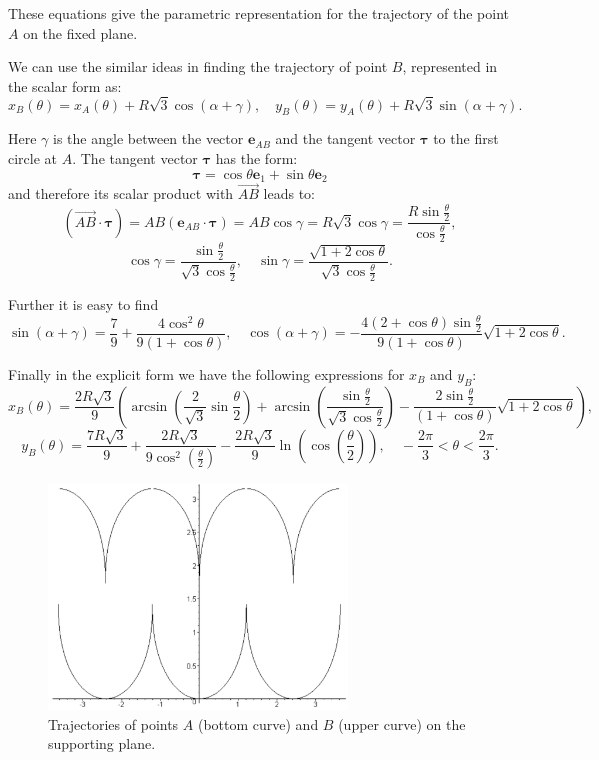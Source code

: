 \documentclass[10pt]{enoc2011}
\renewcommand{\vec}[1]{\boldsymbol{#1}}
\begin{document}
These equations give the parametric representation for the trajectory of the point $A$ on the fixed plane.

We can use the similar ideas in finding  the trajectory of point $B$, 
represented in the scalar form as:
$$
x_B\left(\theta\right)=x_A\left(\theta\right)+R\sqrt{3}\cos\left(\alpha+\gamma\right),\quad
y_B\left(\theta\right)=y_A\left(\theta\right)+R\sqrt{3}\sin\left(\alpha+\gamma\right).
$$

Here $\gamma$ is the angle between the vector $\vec e_{AB}$ and the tangent vector $\vec\tau$ to the first circle at $A$. The tangent vector $\vec\tau$ has the form:
$$
\vec\tau=\cos\theta\vec e_1+\sin\theta\vec e_2
$$
and therefore its scalar product with $\overrightarrow{AB}$ leads to:
$$
\left(\overrightarrow{AB}\cdot\vec\tau\right)=AB\left(\vec e_{AB}\cdot\vec\tau\right)=AB\cos\gamma=
R\sqrt{3}\cos\gamma=\frac{R\sin\frac{\theta}{2}}{\cos\frac{\theta}{2}},
$$
$$
\cos\gamma=\frac{\sin\frac{\theta}{2}}{\sqrt{3}\cos\frac{\theta}{2}},\quad
\sin\gamma=\frac{\sqrt{1+2\cos\theta}}{\sqrt{3}\cos\frac{\theta}{2}}.
$$

Further it is easy to find
$$
\sin\left(\alpha+\gamma\right)=\frac{7}{9}+\frac{4\cos^2\theta}{9\left(1+\cos\theta\right)},\quad
\cos\left(\alpha+\gamma\right)=-\frac{4\left(2+\cos\theta\right)\sin\frac{\theta}{2}}{9\left(1+\cos\theta\right)}
\sqrt{1+2\cos\theta}.
$$

Finally in the explicit form we have the following expressions for $x_B$ and $y_B$:
$$
x_B\left(\theta\right)\!=\!\frac{2R\sqrt{3}}{9}\left(\arcsin\left(\frac{2}{\sqrt{3}}\sin\frac{\theta}{2}\right)\!+\!
\arcsin\left(\frac{\sin\frac{\theta}{2}}{\sqrt{3}\cos\frac{\theta}{2}}\right)\!-\!
\frac{2\sin\frac{\theta}{2}}{\left(1\!+\!\cos\theta\right)}\sqrt{1\!+\!2\cos\theta}\right),
$$
$$
y_B\left(\theta\right)=\frac{7R\sqrt{3}}{9}+\frac{2R\sqrt{3}}{9\cos^2\left(\frac{\theta}{2}\right)}-\frac{2R\sqrt{3}}{9}\ln\left(\cos\left(\frac{\theta}{2}\right)\right),
\quad -\frac{2\pi}{3}<\theta<\frac{2\pi}{3}.
$$

\begin{figure}[h]
\centering\includegraphics[height=6cm]{Oloid3}
\caption{Trajectories of points $A$ (bottom curve) and $B$ (upper curve) on the supporting plane.}
\end{figure}
\end{document}
